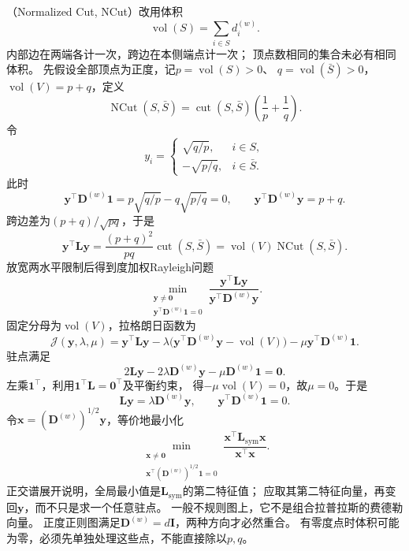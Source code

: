 （Normalized Cut, NCut）改用体积
\[
  \operatorname{vol}(S)=\sum_{i\in S}d_i^{(w)}.
\]
内部边在两端各计一次，跨边在本侧端点计一次；
顶点数相同的集合未必有相同体积。
先假设全部顶点为正度，记\(p=\operatorname{vol}(S)>0\)、
\(q=\operatorname{vol}(\bar S)>0\)，\(\operatorname{vol}(V)=p+q\)，定义
\begin{equation}
  \operatorname{NCut}(S,\bar S)
  =\operatorname{cut}(S,\bar S)\left(\frac1p+\frac1q\right).
  \label{eq:graph-theory-normalized-cut}
\end{equation}
令
\[
  y_i=
  \begin{cases}
    \sqrt{q/p},&i\in S,\\
    -\sqrt{p/q},&i\in\bar S.
  \end{cases}
\]
此时
\[
  \bm y^\top\bm D^{(w)}\bm1=p\sqrt{q/p}-q\sqrt{p/q}=0,
  \qquad
  \bm y^\top\bm D^{(w)}\bm y=p+q.
\]
跨边差为\((p+q)/\sqrt{pq}\)，于是
\[
  \bm y^\top\bm L\bm y
  =\frac{(p+q)^2}{pq}\operatorname{cut}(S,\bar S)
  =\operatorname{vol}(V)\operatorname{NCut}(S,\bar S).
\]
放宽两水平限制后得到度加权Rayleigh问题
\begin{equation}
  \min_{\substack{\bm y\neq\bm0\\
       \bm y^\top\bm D^{(w)}\bm1=0}}
       \frac{\bm y^\top\bm L\bm y}{\bm y^\top\bm D^{(w)}\bm y}.
  \label{eq:graph-theory-normalized-cut-relaxation}
\end{equation}
固定分母为\(\operatorname{vol}(V)\)，拉格朗日函数为
\[
  \mathcal J(\bm y,\lambda,\mu)
  =\bm y^\top\bm L\bm y
  -\lambda\bigl(\bm y^\top\bm D^{(w)}\bm y-\operatorname{vol}(V)\bigr)
  -\mu\bm y^\top\bm D^{(w)}\bm1.
\]
驻点满足
\[
  2\bm L\bm y-2\lambda\bm D^{(w)}\bm y-\mu\bm D^{(w)}\bm1=\bm0.
\]
左乘\(\bm1^\top\)，利用\(\bm1^\top\bm L=\bm0^\top\)及平衡约束，
得\(-\mu\operatorname{vol}(V)=0\)，故\(\mu=0\)。于是
\begin{equation}
  \bm L\bm y=\lambda\bm D^{(w)}\bm y,\qquad
  \bm y^\top\bm D^{(w)}\bm1=0.
  \label{eq:graph-theory-normalized-cut-generalized-eigenproblem}
\end{equation}
令\(\bm x=(\bm D^{(w)})^{1/2}\bm y\)，等价地最小化
\[
  \min_{\substack{\bm x\neq\bm0\\
     \bm x^\top(\bm D^{(w)})^{1/2}\bm1=0}}
     \frac{\bm x^\top\bm L_{\mathrm{sym}}\bm x}{\bm x^\top\bm x}.
\]
正交谱展开说明，全局最小值是\(\bm L_{\mathrm{sym}}\)的第二特征值；
应取其第二特征向量，再变回\(\bm y\)，而不只是求一个任意驻点。
一般不规则图上，它不是组合拉普拉斯的费德勒向量。
正度正则图满足\(\bm D^{(w)}=d\bm I\)，两种方向才必然重合。
有零度点时体积可能为零，必须先单独处理这些点，不能直接除以\(p,q\)。

